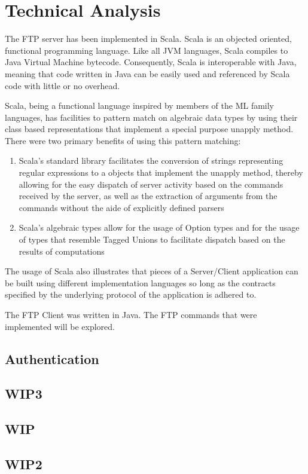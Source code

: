 \chapter{Technical Analysis}
The FTP server has been implemented in Scala. Scala is an objected oriented, functional programming language. Like all JVM languages, Scala compiles to Java Virtual Machine bytecode. Consequently, Scala is interoperable with Java, meaning that code written in Java can be easily used and referenced by Scala code with little or no overhead. 

Scala, being a functional language inspired by members of the ML family languages, has facilities to pattern match on algebraic data types by using their class based representations that implement a special purpose unapply method. There were two primary benefits of using this pattern matching:

\begin{enumerate}
	
	\item Scala's standard library facilitates the conversion of strings representing regular expressions to a objects that implement the unapply method, thereby allowing for the easy dispatch of server activity based on the commands received by the server, as well as the extraction of arguments from the commands without the aide of explicitly defined parsers

	\item Scala's algebraic types allow for the usage of Option types and for the usage of types that resemble Tagged Unions to facilitate dispatch based on the results of computations

\end{enumerate}


The usage of Scala also illustrates that pieces of a Server/Client application can be built using different implementation languages so long as the contracts specified by the underlying protocol of the application is adhered to.

The FTP Client was written in Java. The FTP commands that were implemented will be explored.

\section{Authentication}



\section{WIP3}


\section{WIP}

\section{WIP2}
